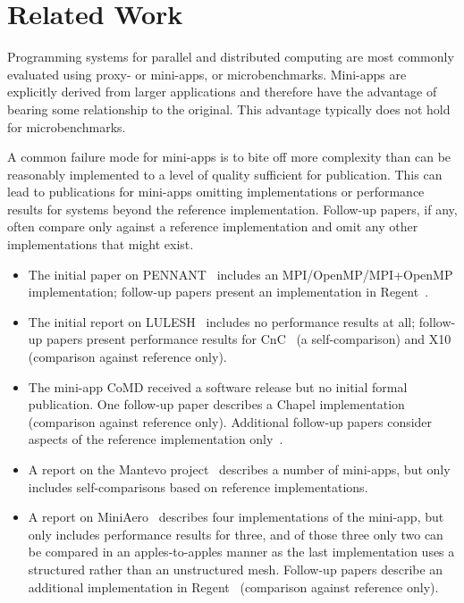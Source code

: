 \section{Related Work}
\label{sec:related-work}

Programming systems for parallel and distributed computing are most
commonly evaluated using proxy- or mini-apps, or
microbenchmarks. Mini-apps are explicitly derived from larger
applications and therefore have the advantage of bearing some
relationship to the original. This advantage typically does not hold
for microbenchmarks.

A common failure mode for mini-apps is to bite off more complexity
than can be reasonably implemented to a level of quality sufficient
for publication. This can lead to publications for mini-apps omitting
implementations or performance results for systems beyond the reference
implementation. Follow-up papers, if any, often compare only against a
reference implementation and omit any other implementations that might
exist.

\begin{itemize}

\item
The initial paper on PENNANT~\cite{PENNANT} includes an MPI/OpenMP/MPI+OpenMP
implementation; follow-up papers present an implementation in
Regent~\cite{Regent15, ControlReplication17, LegionTracing18}.

\item
The initial report on LULESH~\cite{LULESH12} includes no performance
results at all; follow-up papers present performance results for
CnC~\cite{LULESHCNC15} (a self-comparison) and X10~\cite{LULESHX1015}
(comparison against reference only).

\item
The mini-app CoMD received a software release but no initial formal
publication. One follow-up paper describes a Chapel
implementation~\cite{CoMDChapel16} (comparison against reference
only). Additional follow-up papers consider aspects of the reference
implementation only~\cite{CoMDLoadImbalance17,
  CoMDThreadedModels14}.

\item
A report on the Mantevo project~\cite{Mantevo09} describes a number of
mini-apps, but only includes self-comparisons based on reference
implementations.

\item
A report on MiniAero~\cite{SandiaReportManyTaskRuntimes15} describes
four implementations of the mini-app, but only includes performance
results for three, and of those three only two can be compared in an
apples-to-apples manner as the last implementation uses a structured
rather than an unstructured mesh. Follow-up papers describe an
additional implementation in Regent~\cite{Regent15,
  ControlReplication17, LegionTracing18} (comparison against reference
only).

\end{itemize}

